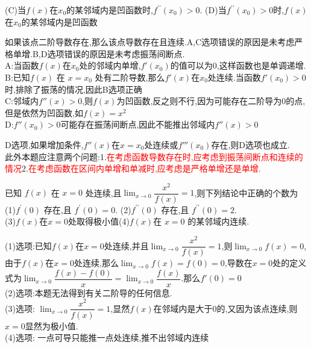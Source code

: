 \documentclass[8pt a4paper, oneside, UTF8]{ctexbook}  %
\begin{document}
\begin{sloppypar}
\begin{problem}
    (C)当$f(x)$在$x_0$的某邻域内是凹函数时,$f^{\prime\prime}(x_0)>0.$
    (D)当$f^{\prime\prime}(x_0)>0$时,$f(x)$在$x_0$的某邻域内是凹函数
    \end{problem}
    \begin{solution}
        如果该点二阶导数存在,那么该点导数存在且连续.A,C选项错误的原因是未考虑严格单增.B,D选项错误的原因是未考虑振荡间断点.\\
        A:当函数$f(x)$在$x_0$处的邻域内单增,$f'(x_0)$的值可以为0,这样函数也是单调递增.\\
        B:已知$f(x)$ 在 $x=x_0$ 处有二阶导数,那么$f'(x)$在$x_0$处连续.当函数$f'(x_0)>0$时,排除了振荡的情况,因此B选项正确\\
        C:邻域内$f''(x)>0$,则$f(x)$为凹函数,反之则不行,因为可能存在二阶导为0的点,但是依然为凹函数,如$f(x)=x^2$\\
        D:$f''(x_0)>0$可能存在振荡间断点,因此不能推出邻域内$f''(x)>0$
    \end{solution}
    \begin{note}
        D选项,如果增加条件,$f''(x)$在$x=x_0$处连续或$f'''(x_0)$存在,则D选项也成立.\\此外本题应注意两个问题:1.\textcolor{red}{在考虑函数导数存在时,应考虑到振荡间断点和连续的情况}2.\textcolor{red}{在考虑函数在区间内单增和单减时,应考虑是严格单增还是单增.}
    \end{note}
    \begin{problem}
    已知 $f(x)$ 在 $x=0$ 处连续,且$\lim_{x\to 0}\dfrac{x^2}{f(x)}=1$,则下列结论中正确的个数为\\
    (1)$f^{\prime}(0)$ 存在,且 $f^\prime(0)=0.$ \quad (2)$f^{\prime\prime}(0)$ 存在,且 $f^{\prime\prime}(0)=2.$\\
    (3)$f(x)$在$x=0$处取得极小值\quad (4)$f\left(x\right)$在 $x=0$ 的某邻域内连续.
    \end{problem}
    \begin{solution}
        (1)选项:已知$f(x)$在$x=0$处连续,并且$\lim_{x\to 0}\dfrac{x^2}{f(x)}=1$,则$\lim_{x\to 0}f(x) =0$,由于$f(x)$在$x=0$处连续,那么$\lim_{x \to 0}f(x)=f(0)=0$,导数在$x=0$处的定义式为$\lim_{x\to 0}\dfrac{f(x)-f(0)}{x}=\lim_{x\to 0} \dfrac{f(x)}{x}$.那么$f'(0)=0$\\
        (2)选项:本题无法得到有关二阶导的任何信息.\\
        (3)选项: $\lim_{x\to 0} \dfrac{x^2}{f(x)}=1$,显然$f(x)$在邻域内是大于0的,又因为该点连续,则$x=0$显然为极小值. \\
        (4)选项: 一点可导只能推一点处连续,推不出邻域内连续
    \end{solution}

\end{sloppypar}
\end{document}
